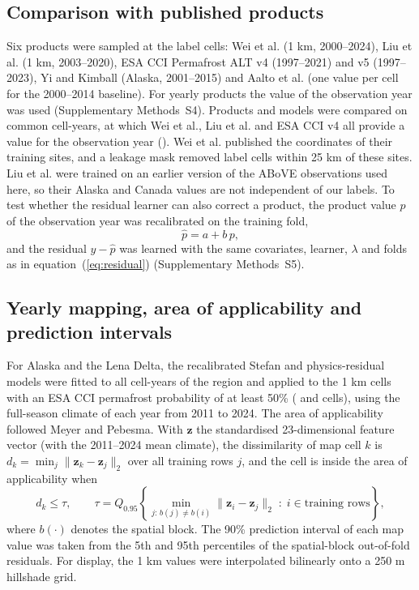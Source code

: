 \subsection{Comparison with published products}
Six products were sampled at the label cells: Wei et al.\cite{Wei2026} (1 km, 2000--2024), Liu et al.\cite{Liu2024} (1 km, 2003--2020), ESA CCI Permafrost ALT v4 (1997--2021) and v5 (1997--2023)\cite{Westermann2024,Westermann2025}, Yi and Kimball\cite{YiKimball2019} (Alaska, 2001--2015) and Aalto et al.\cite{Aalto2018} (one value per cell for the 2000--2014 baseline). For yearly products the value of the observation year was used (Supplementary Methods~S4). Products and models were compared on common cell-years, at which Wei et al., Liu et al. and ESA CCI v4 all provide a value for the observation year (\nyrscc). Wei et al. published the coordinates of their training sites, and a leakage mask removed label cells within 25 km of these sites. Liu et al. were trained on an earlier version of the ABoVE observations used here\cite{Liu2024}, so their Alaska and Canada values are not independent of our labels. To test whether the residual learner can also correct a product, the product value $p$ of the observation year was recalibrated on the training fold,
\begin{equation}
\hat{p} = a + b\, p,
\label{eq:prod}
\end{equation}
and the residual $y-\hat{p}$ was learned with the same covariates, learner, $\lambda$ and folds as in equation~(\ref{eq:residual}) (Supplementary Methods~S5).

\subsection{Yearly mapping, area of applicability and prediction intervals}
For Alaska and the Lena Delta, the recalibrated Stefan and physics-residual models were fitted to all cell-years of the region and applied to the 1 km cells with an ESA CCI permafrost probability of at least 50\% (\nncellmapAk{} and \nncellmapLe{} cells), using the full-season climate of each year from 2011 to 2024. The area of applicability followed Meyer and Pebesma\cite{MeyerPebesma2021}. With $\mathbf{z}$ the standardised 23-dimensional feature vector (with the 2011--2024 mean climate), the dissimilarity of map cell $k$ is $d_k = \min_{j} \lVert \mathbf{z}_k - \mathbf{z}_j \rVert_2$ over all training rows $j$, and the cell is inside the area of applicability when
\begin{equation}
d_k \leq \tau, \qquad \tau = Q_{0.95}\!\left\{ \min_{j:\, b(j) \neq b(i)} \lVert \mathbf{z}_i - \mathbf{z}_j \rVert_2 \;:\; i \in \text{training rows} \right\},
\label{eq:aoa}
\end{equation}
where $b(\cdot)$ denotes the spatial block. The 90\% prediction interval of each map value was taken from the 5th and 95th percentiles of the spatial-block out-of-fold residuals. For display, the 1 km values were interpolated bilinearly onto a 250 m hillshade grid.

